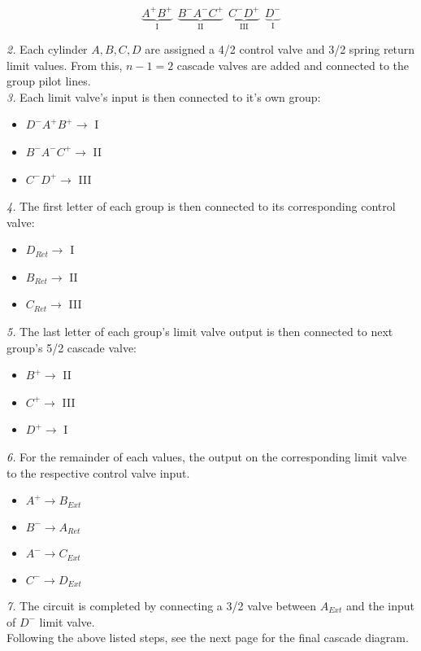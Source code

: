 \begin{equation}
	\label{eq:q3_groups}
	 \underbrace{A^+ B^+}_\text{I} \ \ \underbrace{B^- A^- C^+}_\text{II} \ \ \underbrace{C^- D^+}_\text{III} \ \ \underbrace{D^-}_\text{I} 	
\end{equation}

\textit{2.} Each cylinder $A,B,C,D$ are assigned a 4/2 control valve and 3/2 spring return limit values. From this, $n-1=2$ cascade valves are added and connected to the group pilot lines.\\

\textit{3.} Each limit valve's input is then connected to it's own group:
\begin{itemize}
\item $D^- A^+ B^+\rightarrow$ I
\item $B^- A^- C^+\rightarrow$ II
\item $C^- D^+ \rightarrow$ III\\
\end{itemize}

\textit{4.}  The first letter of each group is then connected to its corresponding control valve:
\begin{itemize}
\item $D_{Ret} \rightarrow$ I
\item $B_{Ret} \rightarrow$ II
\item $C_{Ret} \rightarrow$ III\\
\end{itemize}

\textit{5.}  The last letter of each group's limit valve output is then connected to next group's 5/2 cascade valve:
\begin{itemize}
\item $B^+ \rightarrow$ II
\item $C^+ \rightarrow$ III
\item $D^+ \rightarrow$ I\\
\end{itemize}


\textit{6.} For the remainder of each values, the output on the corresponding limit valve to the respective control valve input.
\begin{itemize}
\item $A^+ \rightarrow B_{Ext}$
\item $B^- \rightarrow A_{Ret}$
\item $A^- \rightarrow C_{Ext}$
\item $C^- \rightarrow D_{Ext}$\\
\end{itemize}

\textit{7.} The circuit is completed by connecting a 3/2 valve between $A_{Ext}$ and the input of $D^-$ limit valve.\\

Following the above listed steps, see the next page for the final cascade diagram.\\

%
